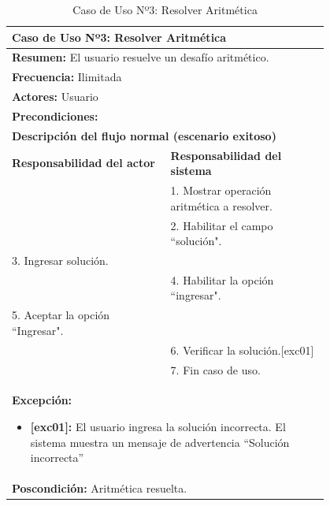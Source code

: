 \begin{table}[H]
    \centering
    \caption{Caso de Uso Nº3: Resolver Aritmética}
    \vspace{10pt}
    \begin{tabular}{| p{0.4\linewidth} | p{0.4\linewidth} |}
        \hline
        \multicolumn{2}{|l|}{\textbf{Caso de Uso Nº3:}  Resolver Aritmética} \\
        \hline
        \multicolumn{2}{|l|}{\textbf{Resumen:}  El usuario resuelve un desafío aritmético.} \\
        \hline
        \multicolumn{2}{|l|}{\textbf{Frecuencia:}  Ilimitada} \\
        \hline
        \multicolumn{2}{|l|}{\textbf{Actores:}  Usuario} \\
        \hline
        \multicolumn{2}{|l|}{\textbf{Precondiciones:}} \\
        \hline
        \multicolumn{2}{|l|}{\textbf{Descripción del flujo normal (escenario exitoso)} } \\
        \hline
        \textbf{Responsabilidad del actor} & \textbf{Responsabilidad del sistema}\\
            & 1. Mostrar operación aritmética a resolver.\\
            & 2. Habilitar el campo ``solución".\\
        3. Ingresar solución. &\\
            & 4. Habilitar la opción ``ingresar".\\
        5. Aceptar la opción ``Ingresar". &\\
            & 6. Verificar la solución.[exc01]\\
            & 7. Fin caso de uso.\\
        \hline
        \multicolumn{2}{|p{0.8\linewidth}|}{
            \textbf{Excepción:}
            \begin{itemize}
                \item \textbf{[exc01]:} El usuario ingresa la solución incorrecta. El sistema muestra un mensaje de advertencia ``Solución incorrecta”
            \end{itemize}}\\
        \hline
        \multicolumn{2}{|l|}{\textbf{Poscondición:}  Aritmética resuelta.} \\
        \hline
    \end{tabular}
    \label{table:3}
\end{table}


